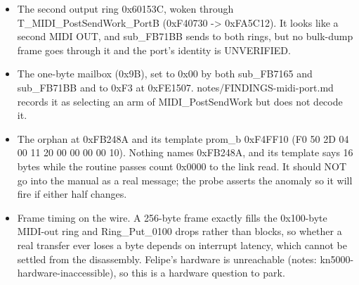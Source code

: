 \begin{itemize}
\item The second output ring 0x60153C, woken through T\_MIDI\_PostSendWork\_PortB (0xF40730 -> 0xFA5C12). It looks like a second MIDI OUT, and sub\_FB71BB sends to both rings, but no bulk-dump frame goes through it and the port's identity is UNVERIFIED.
\item The one-byte mailbox (0x9B), set to 0x00 by both sub\_FB7165 and sub\_FB71BB and to 0xF3 at 0xFE1507. notes/FINDINGS-midi-port.md records it as selecting an arm of MIDI\_PostSendWork but does not decode it.
\item The orphan at 0xFB248A and its template prom\_b 0xF4FF10 (F0 50 2D 04 00 11 20 00 00 00 00 10). Nothing names 0xFB248A, and its template says 16 bytes while the routine passes count 0x0000 to the link read. It should NOT go into the manual as a real message; the probe asserts the anomaly so it will fire if either half changes.
\item Frame timing on the wire. A 256-byte frame exactly fills the 0x100-byte MIDI-out ring and Ring\_Put\_0100 drops rather than blocks, so whether a real transfer ever loses a byte depends on interrupt latency, which cannot be settled from the disassembly. Felipe's hardware is unreachable (notes: kn5000-hardware-inaccessible), so this is a hardware question to park.
\end{itemize}
